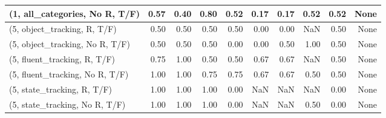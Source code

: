 \begin{table*}[h!]
\begin{adjustbox}{width=2\columnwidth,center}
\begin{tabular}{lrrr|rrr|rrr}
(1, all\_categories, No R, T/F)       &                      0.57 &                  0.40 &                      0.80 &                          0.52 &                      0.17 &                          0.17 &                                   0.52 &                               0.52 &                                  None \\



\midrule
(5, object\_tracking, R, T/F)         &                      0.50 &                  0.50 &                      0.50 &                          0.50 &                      0.00 &                          0.00 &                                    NaN &                               0.50 &                                  None \\
(5, object\_tracking, No R, T/F)      &                      0.50 &                  0.50 &                      0.50 &                          0.00 &                      0.00 &                          0.50 &                                   1.00 &                               0.50 &                                  None \\
(5, fluent\_tracking, R, T/F)         &                      0.75 &                  1.00 &                      0.50 &                          0.50 &                      0.67 &                          0.67 &                                    NaN &                               0.50 &                                  None \\
(5, fluent\_tracking, No R, T/F)      &                      1.00 &                  1.00 &                      0.75 &                          0.75 &                      0.67 &                          0.67 &                                   0.50 &                               0.50 &                                  None \\
(5, state\_tracking, R, T/F)          &                      1.00 &                  1.00 &                      1.00 &                          0.00 &                       NaN &                           NaN &                                    NaN &                               0.00 &                                  None \\
(5, state\_tracking, No R, T/F)       &                      1.00 &                  1.00 &                      1.00 &                          0.00 &                       NaN &                           NaN &                                   0.50 &                               0.00 &                                  None \\

\end{tabular}
\end{adjustbox}
\end{table*}
